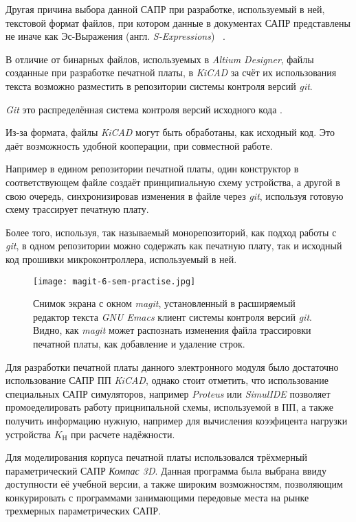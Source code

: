 Другая причина выбора данной САПР при разработке,
используемый в ней, текстовой формат файлов,
при котором данные в документах САПР представлены
не иначе как Эс-Выражения (англ. \textit{S-Expressions})
~\cite{kicad-sexpr}.

В отличие от бинарных файлов,
используемых в \textit{Altium Designer},
файлы созданные при разработке печатной платы,
в \textit{KiCAD} за счёт их использования текста
возможно разместить в репозитории системы контроля версий
\textit{git}.

\textit{Git} это распределённая система контроля версий 
исходного кода \cite{git-dvcs}.

Из-за формата, файлы \textit{KiCAD} могут быть обработаны, как
исходный код.
Это даёт возможность удобной кооперации, при совместной работе.

Например в едином репозитории печатной платы, один конструктор в
соответствующем файле создаёт принципиальную схему устройства, а
другой в свою очередь, синхронизировав изменения в файле через
\textit{git}, используя готовую схему трассирует печатную плату.

Более того, используя, так называемый монорепозиторий, как подход
работы с \textit{git}, в одном репозитории можно содержать как
печатную плату, так и исходный код прошивки микроконтроллера,
используемый в ней.

\begin{figure}[H]
  \centering
  \texttt{[image: magit-6-sem-practise.jpg]}
  \caption{Снимок экрана с окном \textit{magit},
    установленный в расширяемый редактор текста \textit{GNU Emacs}
    клиент системы контроля версий \textit{git}.
    Видно, как \textit{magit} может распознать изменения файла трассировки печатной платы,
    как добавление и удаление строк.}
\end{figure}

Для разработки печатной платы данного электронного модуля было
достаточно использование САПР ПП \textit{KiCAD}, однако стоит
отметить, что использование специальных САПР симуляторов,
например \textit{Proteus} или \textit{SimulIDE}
позволяет промоеделировать работу прицнипальной схемы,
используемой в ПП, а также получить информацию
нужную, например для вычисления коээфицента нагрузки устройства
$K_{\textrm{Н}}$ при расчете надёжности.

Для моделирования корпуса печатной платы использовался
трёхмерный параметрический САПР \textit{Компас 3D}.
Данная программа была выбрана ввиду доступности
её учебной версии, а также широким возможностям,
позволяющим конкурировать с программами
занимающими передовые места на рынке
трехмерных параметрических САПР.

